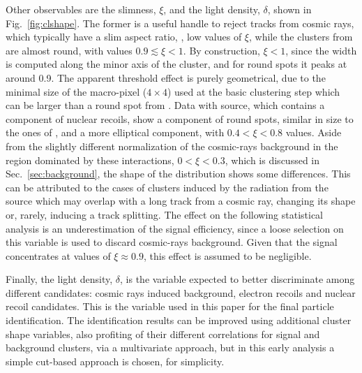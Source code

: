 Other observables are the slimness, $\xi$, and the light density,
$\delta$, shown in Fig.~\ref{fig:clshape}. The former is a useful
handle to reject tracks from cosmic rays, which typically have a slim
aspect ratio, \ie, low values of $\xi$, while the clusters from \fe
are almost round, with values $0.9\lesssim\xi<1$. By construction,
$\xi<1$, since the width is computed along the minor axis of the
cluster, and for round spots it peaks at around 0.9. The apparent
threshold effect is purely geometrical, due to the minimal size of the
macro-pixel ($4{\times}4$) used at the basic clustering step which can
be larger than a round spot from \fe. Data with \ambe source, which
contains a component of nuclear recoils, show a component of round
spots, similar in size to the ones of \fe, and a more elliptical
component, with $0.4<\xi<0.8$ values. Aside from the slightly
different normalization of the cosmic-rays background in the region
dominated by these interactions, $0<\xi<0.3$, which is discussed in
Sec.~\ref{sec:background}, the shape of the distribution shows some
differences. This can be attributed to the cases of clusters induced
by the radiation from the source which may overlap with a long track
from a cosmic ray, changing its shape or, rarely, inducing a track
splitting.  The effect on the following statistical analysis is an
underestimation of the signal efficiency, since a loose selection on
this variable is used to discard cosmic-rays background. Given that
the signal concentrates at values of $\xi \approx 0.9$, this effect is
assumed to be negligible.

Finally, the light density, $\delta$, is the variable expected to
better discriminate among different candidates: cosmic rays induced
background, electron recoils and nuclear recoil candidates. This is
the variable used in this paper for the final particle
identification. The identification results can be improved using
additional cluster shape variables, also profiting of their different
correlations for signal and background clusters, via a multivariate
approach, but in this early analysis a simple cut-based approach is
chosen, for simplicity.


